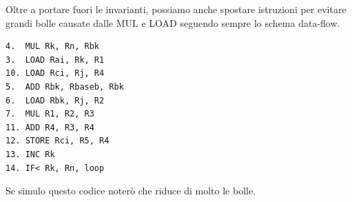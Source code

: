 \documentclass[10pt]{report}
\begin{document}
Oltre a portare fuori le invarianti, possiamo anche spostare istruzioni per evitare grandi bolle causate dalle MUL e LOAD seguendo sempre lo schema data-flow.
\begin{lstlisting}
4.	MUL Rk, Rn, Rbk
3.	LOAD Rai, Rk, R1
10.	LOAD Rci, Rj, R4
5.	ADD Rbk, Rbaseb, Rbk
6.	LOAD Rbk, Rj, R2
7.	MUL R1, R2, R3
11.	ADD R4, R3, R4
12.	STORE Rci, R5, R4
13.	INC Rk
14.	IF< Rk, Rn, loop
\end{lstlisting}
Se simulo questo codice noterò che riduce di molto le bolle.
\end{document}
